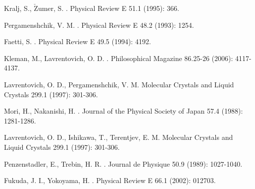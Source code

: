 \documentclass[nottitlepage]{article}
\begin{document}
\begin{thebibliography}{99}
Kralj, S., $\mathrm{\check{Z}}$umer, S.
.
\newblock Physical Review E 51.1 (1995): 366.




Pergamenshchik, V. M.
.
\newblock Physical Review E 48.2 (1993): 1254.

Faetti, S.
.
\newblock  Physical Review E 49.5 (1994): 4192.

Kleman, M., Lavrentovich, O. D.
.
\newblock Philosophical Magazine 86.25-26 (2006): 4117-4137.



Lavrentovich, O. D., Pergamenshchik, V. M.
\newblock Molecular Crystals and Liquid Crystals 299.1 (1997): 301-306.


Mori, H., Nakanishi, H.
.
\newblock Journal of the Physical Society of Japan 57.4 (1988): 1281-1286.

Lavrentovich, O. D., Ishikawa, T., Terentjev, E. M.
\newblock Molecular Crystals and Liquid Crystals 299.1 (1997): 301-306.


Penzenstadler, E., Trebin, H. R.
.
\newblock Journal de Physique 50.9 (1989): 1027-1040.

Fukuda, J. I., Yokoyama, H.
.
\newblock Physical Review E 66.1 (2002): 012703.


\end{thebibliography}
\end{document}
